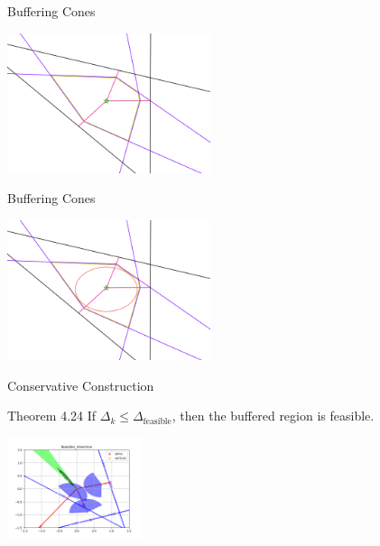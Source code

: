 \documentclass{beamer}
\begin{document}
\begin{frame}{Buffering Cones}
	\begin{center}
		\includegraphics[width=225px]{images/completed_1.png}
	\end{center}
\end{frame}


\begin{frame}{Buffering Cones}
	\begin{center}
		\includegraphics[width=225px]{images/completed_2.png}
	\end{center}
\end{frame}

\begin{frame}{Conservative Construction}
	\begin{block}{Theorem 4.24}
		If $\Delta_k \le \Delta_{\textrm{feasible}}$, then the buffered region is feasible.
	\end{block}
	\begin{center}
		\includegraphics[width=150px]{images/feasible_direction.png}
	\end{center}
\end{frame}
\end{document}
